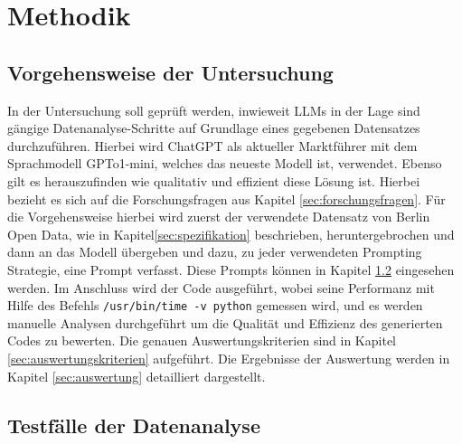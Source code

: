 \documentclass[11pt,a4paper]{article}
\begin{document}
\section{Methodik}
\label{sec:methodik}
\subsection{Vorgehensweise der Untersuchung}
    In der Untersuchung soll geprüft werden, inwieweit LLMs in der Lage sind gängige Datenanalyse-Schritte auf Grundlage eines gegebenen Datensatzes durchzuführen. Hierbei wird ChatGPT als aktueller Marktführer mit dem Sprachmodell GPTo1-mini, welches das neueste Modell ist, verwendet. Ebenso gilt es herauszufinden wie qualitativ und effizient diese Lösung ist. Hierbei bezieht es sich auf die Forschungsfragen aus Kapitel \ref{sec:forschungsfragen}.
    Für die Vorgehensweise hierbei wird zuerst der verwendete Datensatz von Berlin Open Data, wie in Kapitel\ref{sec:spezifikation} beschrieben, heruntergebrochen und dann an das Modell übergeben und dazu, zu jeder verwendeten Prompting Strategie, eine Prompt verfasst. Diese Prompts können in Kapitel \ref{sec:testfaelle} eingesehen werden.
    Im Anschluss wird der Code ausgeführt, wobei seine Performanz mit Hilfe des Befehls \texttt{/usr/bin/time -v python} gemessen wird, und es werden manuelle Analysen durchgeführt um die Qualität und Effizienz des generierten Codes zu bewerten. Die genauen Auswertungskriterien sind in Kapitel \ref{sec:auswertungskriterien} aufgeführt.
    Die Ergebnisse der Auswertung werden in Kapitel \ref{sec:auswertung} detailliert dargestellt.

\subsection{Testfälle der Datenanalyse}
\label{sec:testfaelle}
\end{document}
